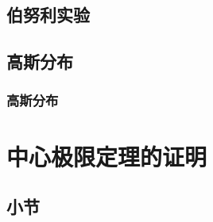 \documentclass[master]{hdu-thesis}
\begin{document}
\section{伯努利实验}

\section{高斯分布}

\subsection{高斯分布}

\chapter{中心极限定理的证明}
\section{小节}
\end{document}
